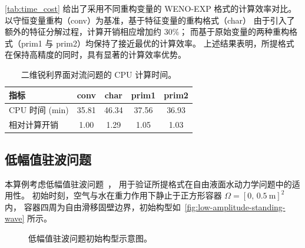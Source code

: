 \documentclass[12pt,a4paper]{article}
\numberwithin{equation}{section}    %
\begin{document}
\autoref{tab:time_cost} 给出了采用不同重构变量的 WENO-EXP 格式的计算效率对比。
以守恒变量重构（conv）为基准，基于特征变量的重构格式（char）
由于引入了额外的特征分解过程，计算开销相应增加约 $30\%$；
而基于原始变量的两种重构格式（prim1 与 prim2）均保持了接近最优的计算效率。
上述结果表明，所提格式在保持高精度的同时，具有显著的计算效率优势。

\begin{table}[!htbp]
    \centering
    \caption{二维锐利界面对流问题的 CPU 计算时间。}
    \label{tab:time_cost}
    \begin{tabular}{lcccc}
        \toprule
        指标                & conv  & char  & prim1 & prim2 \\
        \midrule
        CPU 时间 (min)      & 35.81 & 46.34 & 37.56 & 36.93 \\
        相对计算开销        & 1.00  & 1.29  & 1.05  & 1.03  \\
        \bottomrule
    \end{tabular}
\end{table}


\subsection{低幅值驻波问题}

本算例考虑低幅值驻波问题~\cite{Sussman2007,Frandsen2003}，
用于验证所提格式在自由液面水动力学问题中的适用性。
初始时刻，空气与水在重力作用下静止于正方形容器
$\Omega = [0,\, 0.5~\mathrm{m}]^2$ 内，
容器四周为自由滑移固壁边界，初始构型如~\autoref{fig:low-amplitude-standing-wave} 所示。
\begin{figure}[!htbp]
    \centering
    
    \caption{低幅值驻波问题初始构型示意图。}
    \label{fig:low-amplitude-standing-wave}
\end{figure}
\end{document}
